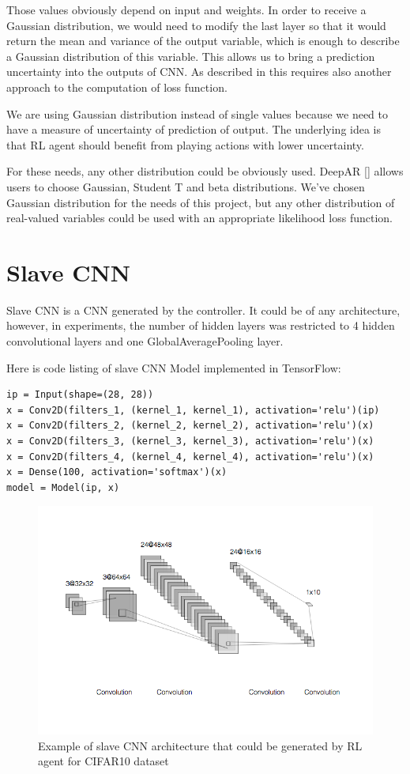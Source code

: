 Those values obviously depend on input and weights. In order to receive a Gaussian distribution, we would need to modify the last layer so that it would return the mean and variance of the output variable, which is enough to describe a Gaussian distribution of this variable. This allows us to bring a prediction uncertainty into the outputs of CNN. As described in \cite{2017arXiv170404110S} this requires also another approach to the computation of loss function.

We are using Gaussian distribution instead of single values because we need to have a measure of uncertainty of prediction of output. The underlying idea is that RL agent should benefit from playing actions with lower uncertainty.

For these needs, any other distribution could be obviously used. DeepAR [\cite{2017arXiv170404110S}] allows users to choose Gaussian, Student T and beta distributions. We've chosen Gaussian distribution for the needs of this project, but any other distribution of real-valued variables could be used with an appropriate likelihood loss function.

\section{Slave CNN}

Slave CNN is a CNN generated by the controller. It could be of any architecture, however, in experiments, the number of hidden layers was restricted to 4 hidden convolutional layers and one GlobalAveragePooling layer.

Here is code listing of slave CNN Model implemented in TensorFlow:

\begin{verbatim}
ip = Input(shape=(28, 28))
x = Conv2D(filters_1, (kernel_1, kernel_1), activation='relu')(ip)
x = Conv2D(filters_2, (kernel_2, kernel_2), activation='relu')(x)
x = Conv2D(filters_3, (kernel_3, kernel_3), activation='relu')(x)
x = Conv2D(filters_4, (kernel_4, kernel_4), activation='relu')(x)
x = Dense(100, activation='softmax')(x)
model = Model(ip, x)
\end{verbatim}

\begin{figure}[!htb]
  \includegraphics[width=\linewidth]{images/slave-example.png}
  \caption{Example of slave CNN architecture that could be generated by RL agent for CIFAR10 dataset}
  \label{fig:slave}
\end{figure}


